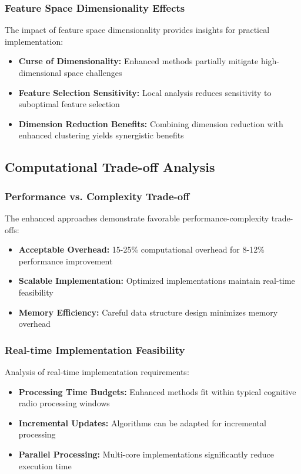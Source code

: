 \subsubsection{Feature Space Dimensionality Effects}
The impact of feature space dimensionality provides insights for practical implementation:
\begin{itemize}
\item \textbf{Curse of Dimensionality:} Enhanced methods partially mitigate high-dimensional space challenges
\item \textbf{Feature Selection Sensitivity:} Local analysis reduces sensitivity to suboptimal feature selection
\item \textbf{Dimension Reduction Benefits:} Combining dimension reduction with enhanced clustering yields synergistic benefits
\end{itemize}

\subsection{Computational Trade-off Analysis}

\subsubsection{Performance vs. Complexity Trade-off}
The enhanced approaches demonstrate favorable performance-complexity trade-offs:
\begin{itemize}
\item \textbf{Acceptable Overhead:} 15-25\% computational overhead for 8-12\% performance improvement
\item \textbf{Scalable Implementation:} Optimized implementations maintain real-time feasibility
\item \textbf{Memory Efficiency:} Careful data structure design minimizes memory overhead
\end{itemize}

\subsubsection{Real-time Implementation Feasibility}
Analysis of real-time implementation requirements:
\begin{itemize}
\item \textbf{Processing Time Budgets:} Enhanced methods fit within typical cognitive radio processing windows
\item \textbf{Incremental Updates:} Algorithms can be adapted for incremental processing
\item \textbf{Parallel Processing:} Multi-core implementations significantly reduce execution time
\end{itemize}

